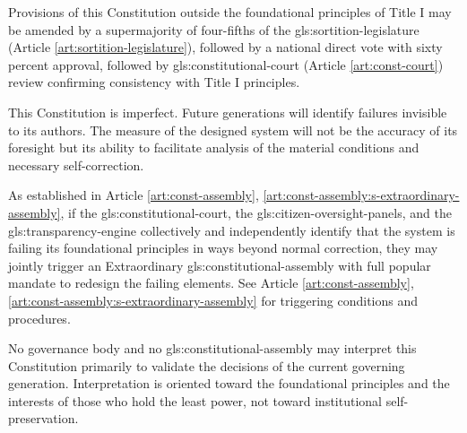 


Provisions of this Constitution outside the foundational principles of Title I may be amended by a supermajority of four-fifths of the \gls{gls:sortition-legislature} (Article \ref{art:sortition-legislature}), followed by a national direct vote with sixty percent approval, followed by \gls{gls:constitutional-court} (Article \ref{art:const-court}) review confirming consistency with Title I principles.


This Constitution is imperfect. Future generations will identify failures invisible to its authors. The measure of the designed system will not be the accuracy of its foresight but its ability to facilitate analysis of the material conditions and necessary self-correction.

As established in Article \ref{art:const-assembly}, \ref{art:const-assembly:s-extraordinary-assembly}, if the \gls{gls:constitutional-court}, the \gls{gls:citizen-oversight-panels}, and the \gls{gls:transparency-engine} collectively and independently identify that the system is failing its foundational principles in ways beyond normal correction, they may jointly trigger an Extraordinary \gls{gls:constitutional-assembly} with full popular mandate to redesign the failing elements. See Article \ref{art:const-assembly}, \ref{art:const-assembly:s-extraordinary-assembly} for triggering conditions and procedures.

No governance body and no \gls{gls:constitutional-assembly} may interpret this Constitution primarily to validate the decisions of the current governing generation. Interpretation is oriented toward the foundational principles and the interests of those who hold the least power, not toward institutional self-preservation.